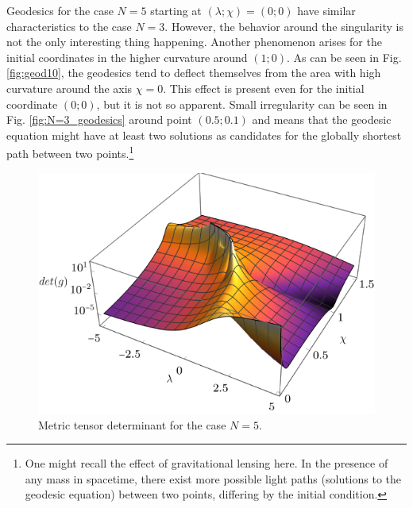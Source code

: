 Geodesics for the case $N=5$ starting at $(\lambda;\chi)=(0;0)$ have similar characteristics to the case $N=3$. However, the behavior around the singularity is not the only interesting thing happening. Another phenomenon arises for the initial coordinates in the higher curvature around $(1;0)$. As can be seen in Fig. \ref{fig:geod10}, the geodesics tend to deflect themselves from the area with high curvature around the axis $\chi=0$. This effect is present even for the initial coordinate $(0;0)$, but it is not so apparent. Small irregularity can be seen in Fig. \ref{fig:N=3_geodesics} around point $(0.5;0.1)$ and means that the geodesic equation might have at least two solutions as candidates for the globally shortest path between two points.\footnote{One might recall the effect of gravitational lensing here. In the presence of any mass in spacetime, there exist more possible light paths (solutions to the geodesic equation) between two points, differing by the initial condition.} 

\begin{figure}[H]
    \centering
    \vspace{20pt}\includegraphics[scale=1.3]{../img/N=5_det3D.pdf}
    \caption{Metric tensor determinant for the case $N=5$.}
    \label{fig:N=5_det3D}    
\end{figure}

